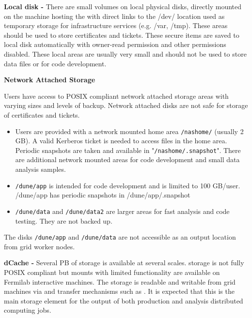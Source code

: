 \documentclass[../main-v1.tex]{subfiles}
\begin{document}
\begin{description}

    \item{\bf Local disk -}  There are small   volumes on local physical disks, directly
mounted on the machine hosting the  with direct links to the /dev/ location
used as temporary storage for infrastructure services (e.g. /var, /tmp).
These areas should be used to store certificates and tickets. These secure items are saved to local disk automatically with owner-read permission and other permissions disabled.
These local areas are usually very small and should not be used to store data files or for code development.
    
    \item{\bf Network Attached Storage}
    
     Users have access to POSIX compliant network attached storage areas with varying sizes and levels of backup. Network attached disks are not safe for storage of certificates and tickets.

 \begin{itemize} 
   \item Users are provided with a network mounted home area {\tt /nashome/} (usually 2 GB).    A valid Kerberos ticket is needed   to access files in the home area. Periodic snapshots are taken and available in "{\tt  /nashome/.snapshot}". There are additional network mounted areas for code development and small data analysis samples. 
\item {\tt /dune/app} is intended for code development and is  limited to 100 GB/user.  /dune/app has periodic snapshots in /dune/app/.snapshot

\item  {\tt /dune/data} and {\tt /dune/data2} are larger areas for fast analysis and code testing.  They are not backed up.  
\end{itemize}
 
The  disks {\tt /dune/app} and {\tt /dune/data} are not accessible as an output location from grid worker nodes. 
 
\item{\bf dCache -} Several PB of \cite{Millar:2014cfa} storage is available at several scales.  storage is not fully POSIX compliant but  mounts with limited functionality are available on Fermilab interactive machines. The  storage is readable and writable from grid machines via  and transfer mechanisms such as . It is expected that this is the main storage element for the output of both production and analysis distributed computing jobs.


\end{description}
\end{document}

